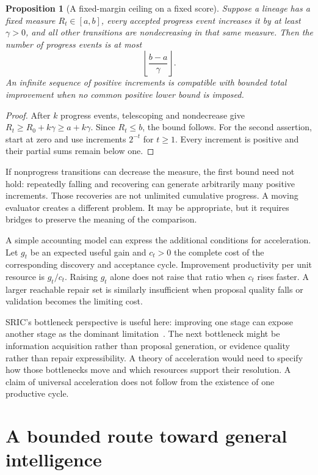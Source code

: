 \documentclass[11pt,letterpaper]{article}
\theoremstyle{plain}
\newtheorem{proposition}[theorem]{Proposition}
\theoremstyle{definition}
\begin{document}
\begin{proposition}[A fixed-margin ceiling on a fixed score]\label{prop:ceiling}
Suppose a lineage has a fixed measure $R_t\in[a,b]$, every accepted progress event increases it by at least $\gamma>0$, and all other transitions are nondecreasing in that same measure. Then the number of progress events is at most
\[
\left\lfloor\frac{b-a}{\gamma}\right\rfloor.
\]
An infinite sequence of positive increments is compatible with bounded total improvement when no common positive lower bound is imposed.
\end{proposition}
\begin{proof}
After $k$ progress events, telescoping and nondecrease give $R_t\geq R_0+k\gamma\geq a+k\gamma$. Since $R_t\leq b$, the bound follows. For the second assertion, start at zero and use increments $2^{-t}$ for $t\geq1$. Every increment is positive and their partial sums remain below one.
\end{proof}

If nonprogress transitions can decrease the measure, the first bound need not hold: repeatedly falling and recovering can generate arbitrarily many positive increments. Those recoveries are not unlimited cumulative progress. A moving evaluator creates a different problem. It may be appropriate, but it requires bridges to preserve the meaning of the comparison.

A simple accounting model can express the additional conditions for acceleration. Let $g_t$ be an expected useful gain and $c_t>0$ the complete cost of the corresponding discovery and acceptance cycle. Improvement productivity per unit resource is $g_t/c_t$. Raising $g_t$ alone does not raise that ratio when $c_t$ rises faster. A larger reachable repair set is similarly insufficient when proposal quality falls or validation becomes the limiting cost.

SRIC's bottleneck perspective is useful here: improving one stage can expose another stage as the dominant limitation~\cite{sric}. The next bottleneck might be information acquisition rather than proposal generation, or evidence quality rather than repair expressibility. A theory of acceleration would need to specify how those bottlenecks move and which resources support their resolution. A claim of universal acceleration does not follow from the existence of one productive cycle.


\clearpage\part{A bounded route toward general intelligence}\label{part:architecture}
\end{document}
